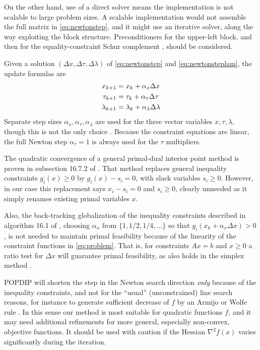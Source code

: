 \documentclass[11pt]{article}
\newcommand{\grad}{\nabla}
\begin{document}
On the other hand, use of a direct solver means the implementation is not scalable to large problem sizes.  A scalable implementation would not assemble the full matrix in \eqref{eq:newtonstep}, and it might use an iterative solver, along the way exploiting the block structure.  Preconditioners \cite{Bueler2021} for the upper-left block, and then for the equality-constraint Schur complement \cite[chapters 14]{Bueler2021}, should be considered.

Given a solution $(\Delta x,\Delta\tau,\Delta\lambda)$ of \eqref{eq:newtonstep} and \eqref{eq:newtonsteplam}, the update formulas are
\begin{align}
x_{k+1} &= x_k + \alpha_x \Delta x \label{eq:updates} \\
\tau_{k+1} &= \tau_k + \alpha_\tau \Delta \tau \notag \\
\lambda_{k+1} &= \lambda_k + \alpha_\lambda \Delta \lambda \notag
\end{align}
Separate step sizes $\alpha_x,\alpha_\tau,\alpha_\lambda$ are used for the three vector variables $x,\tau,\lambda$, though this is not the only choice \cite{YamashitaYabe1996}.  Because the constraint equations are linear, the full Newton step $\alpha_\tau=1$ is always used for the $\tau$ multipliers.

The quadratic convergence of a general primal-dual interior point method is proven in subsection 16.7.2 of \cite{GrivaNashSofer2009}.  That method replaces general inequality constraints $g_i(x)\ge 0$ by $g_i(x) - s_i =0$, with slack variables $s_i\ge 0$.  However, in our case this replacement says $x_i-s_i=0$ and $s_i\ge 0$, clearly unneeded as it simply renames existing primal variables $x$.

Also, the back-tracking globalization of the inequality constraints described in algorithm 16.1 of \cite{GrivaNashSofer2009}, choosing $\alpha_x$ from $\{1,1/2,1/4,\dots\}$ so that $g_i(x_k + \alpha_x \Delta x) > 0$, is not needed to maintain primal feasibility because of the linearity of the constraint functions in \eqref{eq:problem}.  That is, for constraints $Ax=b$ and $x\ge 0$ a ratio test for $\Delta x$ will guarantee primal feasibility, as also holds in the simplex method \cite[chapter 5]{GrivaNashSofer2009}.

POPDIP will shorten the step in the Newton search direction \emph{only} because of the inequality constraints, and not for the ``usual'' (unconstrained) line search reasons, for instance to generate sufficient decrease of $f$ by an Armijo or Wolfe rule \cite[section 11.5]{GrivaNashSofer2009}.  In this sense our method is most suitable for quadratic functions $f$, and it may need additional refinements for more general, especially non-convex, objective functions.  It should be used with caution if the Hessian $\grad^2 f(x)$ varies significantly during the iteration.
\end{document}
